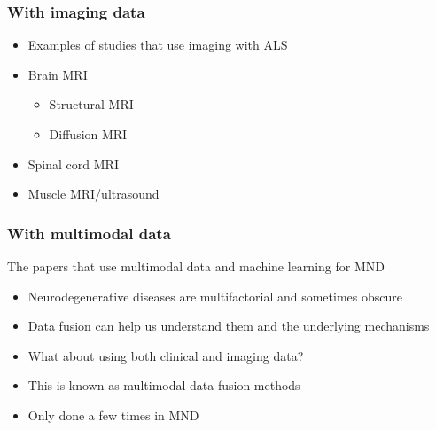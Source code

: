\subsubsection{With imaging data}

\begin{itemize}
    \item Examples of studies that use imaging with ALS
    \item Brain MRI
    \begin{itemize}
        \item Structural MRI
        \item Diffusion MRI
    \end{itemize}
    \item Spinal cord MRI
    \item Muscle MRI/ultrasound
\end{itemize}


\subsubsection{With multimodal data}

The papers that use multimodal data and machine learning for MND

\begin{itemize}
    \item Neurodegenerative diseases are multifactorial and sometimes obscure
    \item Data fusion can help us understand them and the underlying mechanisms
    \item What about using both clinical and imaging data?
    \item This is known as multimodal data fusion methods
    \item Only done a few times in MND
\end{itemize}


